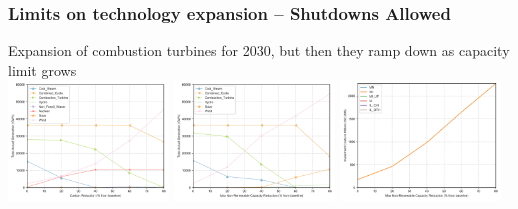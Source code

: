 \documentclass[xcolor=dvipsnames]{beamer}
\begin{document}
%
%


\begin{frame}
  \frametitle{Limits on technology expansion -- Shutdowns Allowed}
  Expansion of combustion turbines for 2030, but then they ramp down as capacity limit grows\\
  \includegraphics[width=0.32\textwidth]{includes/no_leakage_shutdowns_agg_generation_cntlreg.png}
  \includegraphics[width=0.32\textwidth]{includes/no_leakage_maxNR_agg_generation_cntlreg.png}
  \includegraphics[width=0.32\textwidth]{includes/no_leakage_maxNR_invest_costs_by_region.png}


\end{frame}
\end{document}
